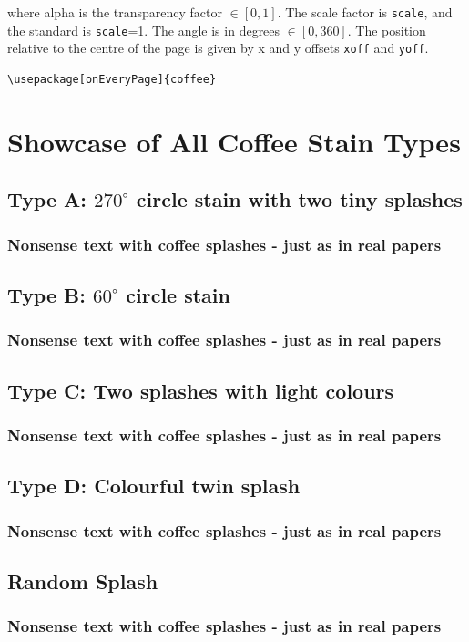 \documentclass[12pt,letterpaper,twoside]{book}
\begin{document}
where alpha is the transparency factor $\in [0,1]$. The scale factor is {\tt scale}, and the standard is {\tt scale}=1.
The angle is in degrees $\in [0,360]$.
The position relative to the centre of the page is given by x and y
offsets \texttt{xoff} and \texttt{yoff}.

\begin{verbatim}
\usepackage[onEveryPage]{coffee}
\end{verbatim}

\newpage

\section{Showcase of All Coffee Stain Types}

\subsection*{Type A: $270^\circ$ circle stain with two tiny splashes}
\subsubsection{Nonsense text with coffee splashes - just as in real papers}
\lipsum[1-3]

\newpage

\subsection*{Type B: $60^\circ$ circle stain}
\subsubsection{Nonsense text with coffee splashes - just as in real papers}
\lipsum[1-3]

\newpage

\subsection*{Type C: Two splashes with light colours}
\subsubsection{Nonsense text with coffee splashes - just as in real papers}
\lipsum[1-3]

\newpage

\subsection*{Type D: Colourful twin splash}
\subsubsection{Nonsense text with coffee splashes - just as in real papers}
\lipsum[1-3]

\newpage

\subsection*{Random Splash}
\subsubsection{Nonsense text with coffee splashes - just as in real papers}
\lipsum[1-3]
\cofeSplash{}
\end{document}
